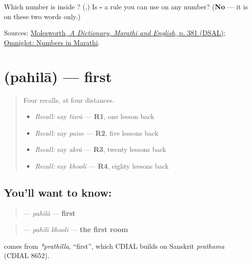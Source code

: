\begin{tcolorbox}[breakable,colback=teal!4,colframe=teal!35!black,title={Before you move on}]
Which number is inside \textbf{}? (\textbf{}.) Is \textbf{-} a rule you can use on any number? (\textbf{No} — it is on these two words only.)

Sources: \href{https://dsal.uchicago.edu/cgi-bin/app/molesworth\_query.py?qs=\%E0\%A4\%A4\%E0\%A4\%BF\%E0\%A4\%B8\%E0\%A4\%B0\%E0\%A4\%BE\&searchhws=yes}{Molesworth, \emph{A Dictionary, Marathi and English}, p. 381 (DSAL)}; \href{https://www.omniglot.com/language/numbers/marathi.htm}{Omniglot: Numbers in Marathi}.
\end{tcolorbox}
\section[\texorpdfstring{\mr{पहिला} (pahilā)}{पहिला (pahilā)}]{ (pahilā) — first}

\label{lesson:MR-C60-pahila}



\begin{quote}
Four recalls, at four distances.

\begin{itemize}
\raggedright
  \item \emph{Recall:} say \emph{tisrā} — \textbf{R1}, one lesson back
  \item \emph{Recall:} say \emph{paise} — \textbf{R2}, five lessons back
  \item \emph{Recall:} say \emph{akrā} — \textbf{R3}, twenty lessons back
  \item \emph{Recall:} say \emph{khoolī} — \textbf{R4}, eighty lessons back
\end{itemize}
\end{quote}

\subsection*{You'll want to know: }
\begin{quote}
\textbf{} — \emph{pahilā} — \textbf{first}
\end{quote}

\begin{quote}
\textbf{ } — \emph{pahilī khoolī} — \textbf{the first room}
\end{quote}

\begin{cousinweb}
\textbf{} comes from \emph{*prathilla}, \textquotedblleft{}first\textquotedblright{}, which CDIAL builds on Sanskrit \emph{prathama} (CDIAL 8652).
\end{cousinweb}

